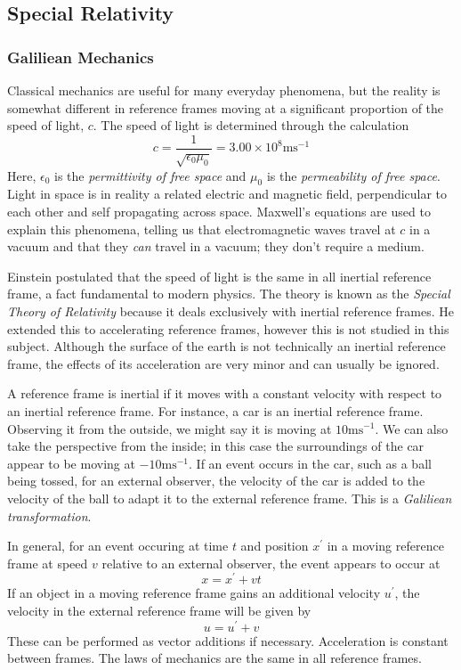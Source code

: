 \documentclass[12pt]{report}
\begin{document}
\begin{flushleft}
\section*{Special Relativity}
\subsubsection*{Galiliean Mechanics}
Classical mechanics are useful for many everyday phenomena, but the reality is
somewhat different in reference frames moving at a significant proportion of
the speed of light, \(c\). The speed of light is determined through the 
calculation
\[c = \frac{1}{\sqrt{\epsilon_0\mu_0}} = 3.00\times10^8\mathrm{ms}^{-1}\]
Here, \(\epsilon_0\) is the \textit{permittivity of free space} and \(\mu_0\)
is the \textit{permeability of free space}. Light in space is in reality a
related electric and magnetic field, perpendicular to each other and self
propagating across space. Maxwell's equations are used to explain this 
phenomena, telling us that electromagnetic waves travel at \(c\) in a vacuum
and that they \textit{can} travel in a vacuum; they don't require a medium.

\bigskip
Einstein postulated that the speed of light is the same in all inertial 
reference frame, a fact fundamental to modern physics. The theory is known
as the \textit{Special Theory of Relativity} because it deals exclusively
with inertial reference frames. He extended this to accelerating reference
frames, however this is not studied in this subject. Although the surface of
the earth is not technically an inertial reference frame, the effects of its
acceleration are very minor and can usually be ignored. 

\bigskip
A reference frame is inertial if it moves with a constant velocity with respect
to an inertial reference frame. For instance, a car is an inertial reference
frame. Observing it from the outside, we might say it is moving at 
\(10\mathrm{ms}^{-1}\). We can also take the perspective from the inside; in
this case the surroundings of the car appear to be moving at 
\(-10\mathrm{ms}^{-1}\). If an event occurs in the car, such as a ball being 
tossed, for an external observer, the velocity of the car is added to the 
velocity of the ball to adapt it to the external reference frame. This is a 
\textit{Galiliean transformation}.

\bigskip
In general, for an event occuring at time \(t\) and position \(x^\prime\) in a
moving reference frame at speed \(v\) relative to an external observer, the 
event appears to occur at
\[x = x^\prime + vt\]
If an object in a moving reference frame gains an additional velocity 
\(u^\prime\), the velocity in the external reference frame will be given
by
\[u = u^\prime + v\]
These can be performed as vector additions if necessary. Acceleration is 
constant between frames. The laws of mechanics are the same in all reference
frames.


\end{flushleft}
\end{document}
